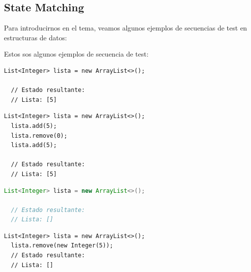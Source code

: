 
\subsection{State Matching}
\label{sec:stateMatching}


Para introducirnos en el tema, veamos algunos ejemplos de secuencias de test en estructuras de datos:

Estos sos algunos ejemplos de secuencia de test: 

\bigskip
\begin{lstlisting}[numbers=none, caption={Crear una lista vacía}, label={lst:emptylist}, captionpos=b, frame=tb, basicstyle=\scriptsize]
  List<Integer> lista = new ArrayList<>();

  // Estado resultante:
  // Lista: [5]
\end{lstlisting}

\vspace{1em}

\begin{lstlisting}[numbers=none, caption={Crear una lista vacía, agregar y eliminar un elemento, luego agregarlo nuevamente}, label={lst:add-remove-add}, captionpos=b, frame=tb, basicstyle=\scriptsize]
  List<Integer> lista = new ArrayList<>();
  lista.add(5);
  lista.remove(0);
  lista.add(5);

  // Estado resultante:
  // Lista: [5]
\end{lstlisting}
  
\vspace{1em}

\begin{lstlisting}[language=Java, caption={Crear una lista vacía}, label={lst:remove-empty}, captionpos=b, frame=tb, basicstyle=\scriptsize]
  List<Integer> lista = new ArrayList<>();
  
  // Estado resultante:
  // Lista: []
\end{lstlisting}

\vspace{1em}
 
\begin{lstlisting}[numbers=none, caption={Intentar eliminar un elemento en una lista vacía}, label={lst:remove-empty}, captionpos=b, frame=tb, basicstyle=\scriptsize]
  List<Integer> lista = new ArrayList<>();
  lista.remove(new Integer(5)); 
  // Estado resultante:
  // Lista: []
\end{lstlisting}
  
